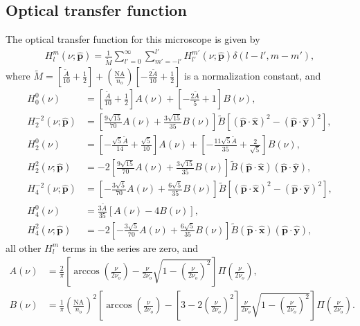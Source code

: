 \documentclass[11pt]{article}
\providecommand{\mh}[1]{\mathbf{\hat{#1}}}
\begin{document}
\subsection{Optical transfer function}
The optical transfer function for this microscope is given by
\begin{align}
  H_l^m(\nu; \mh{p}) = \frac{1}{\tilde{M}}\sum_{l'=0}^{\infty}\sum_{m'=-l'}^{l'} H_{l'}^{m'}(\nu; \mh{p})\delta(l - l', m - m'),  
\end{align}
where
$\tilde{M} = \left[\frac{\tilde{A}}{10} + \frac{1}{2}\right] + \left(\frac{\text{NA}}{n_o}\right)\left[-\frac{2\tilde{A}}{10} + \frac{1}{2}\right]$ is a
normalization constant, and
\begin{align}
  H_0^0(\nu) &= \left[\frac{\tilde{A}}{10} + \frac{1}{2}\right]A(\nu) + \left[-\frac{2\tilde{A}}{5} + 1\right]B(\nu),\\
  H_2^{-2}(\nu; \mh{p}) &= \left[\frac{9\sqrt{15}}{70}A(\nu) + \frac{3\sqrt{15}}{35}B(\nu)\right]\tilde{B}[(\mh{p}\cdot\mh{x})^2 - (\mh{p}\cdot\mh{y})^2],\\
  H_2^0(\nu) &= \left[-\frac{\sqrt{5}\tilde{A}}{14} + \frac{\sqrt{5}}{10}\right]A(\nu) + \left[-\frac{11\sqrt{5}\tilde{A}}{35} + \frac{2}{\sqrt{5}}\right]B(\nu),\\
  H_2^2(\nu; \mh{p}) &= -2\left[\frac{9\sqrt{15}}{70}A(\nu) + \frac{3\sqrt{15}}{35}B(\nu)\right]\tilde{B}(\mh{p}\cdot\mh{x})(\mh{p}\cdot\mh{y}),\\
  H_4^{-2}(\nu; \mh{p}) &= \left[-\frac{3\sqrt{5}}{70}A(\nu) + \frac{6\sqrt{5}}{35}B(\nu)\right]\tilde{B}[(\mh{p}\cdot\mh{x})^2 - (\mh{p}\cdot\mh{y})^2],\\
  H_4^0(\nu) &= \frac{3\tilde{A}}{35}[A(\nu) - 4B(\nu)],\\
  H_4^2(\nu; \mh{p}) &= -2\left[-\frac{3\sqrt{5}}{70}A(\nu) + \frac{6\sqrt{5}}{35}B(\nu)\right]\tilde{B}(\mh{p}\cdot\mh{x})(\mh{p}\cdot\mh{y}),
\end{align}
all other $H_l^m$ terms in the series are zero, and  
\begin{align}
  A(\nu) &= \frac{2}{\pi}\left[\arccos\left(\frac{\nu}{2\nu_o}\right) - \frac{\nu}{2\nu_o}\sqrt{1 - \left(\frac{\nu}{2\nu_o}\right)^2}\right]\Pi\left(\frac{\nu}{2\nu_o}\right),\\
  B(\nu) &= \frac{1}{\pi}\left(\frac{\text{NA}}{n_o}\right)^2\left[\arccos\left(\frac{\nu}{2\nu_o}\right) - \left[3 - 2\left(\frac{\nu}{2\nu_o}\right)^2\right]\frac{\nu}{2\nu_o} \sqrt{1 - \left(\frac{\nu}{2\nu_o}\right)^2}\right]\Pi\left(\frac{\nu}{2\nu_o}\right).                 
\end{align}
\end{document}
